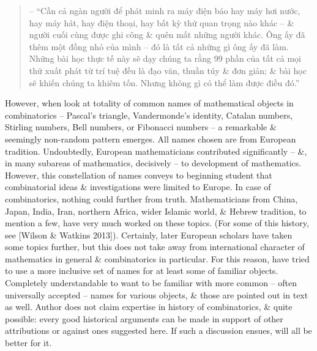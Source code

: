 \documentclass{article}
\begin{document}
\begin{itemize}
\begin{itemize}
\begin{quotation}
			-- ``Cần cả ngàn người để phát minh ra máy điện báo hay máy hơi nước, hay máy hát, hay điện thoại, hay bất kỳ thứ quan trọng nào khác -- \& người cuối cùng được ghi công \& quên mất những người khác. Ông ấy đã thêm một đồng nhỏ của mình -- đó là tất cả những gì ông ấy đã làm. Những bài học thực tế này sẽ dạy chúng ta rằng 99 phần của tất cả mọi thứ xuất phát từ trí tuệ đều là đạo văn, thuần túy \& đơn giản; \& bài học sẽ khiến chúng ta khiêm tốn. Nhưng không gì có thể làm được điều đó.''
		\end{quotation}
		However, when look at totality of common names of mathematical objects in combinatorics -- Pascal's triangle, Vandermonde's identity, Catalan numbers, Stirling numbers, Bell numbers, or Fibonacci numbers -- a remarkable \& seemingly non-random pattern emerges. All names chosen are from European tradition. Undoubtedly, European mathematicians contributed significantly -- \&, in many subareas of mathematics, decisively -- to development of mathematics. However, this constellation of names conveys to beginning student that combinatorial ideas \& investigations were limited to Europe. In case of combinatorics, nothing could further from truth. Mathematicians from China, Japan, India, Iran, northern Africa, wider Islamic world, \& Hebrew tradition, to mention a few, have very much worked on these topics. (For some of this history, see [Wilson \& Watkins 2013]). Certainly, later European scholars have taken some topics further, but this does not take away from international character of mathematics in general \& combinatorics in particular. For this reason, have tried to use a more inclusive set of names for at least some of familiar objects. Completely understandable to want to be familiar with more common -- often universally accepted -- names for various objects, \& those are pointed out in text as well. Author does not claim expertise in history of combinatorics, \& quite possible: every good historical arguments can be made in support of other attributions or against ones suggested here. If such a discussion ensues, will all be better for it.
		

\end{itemize}
\end{itemize}
\end{document}
